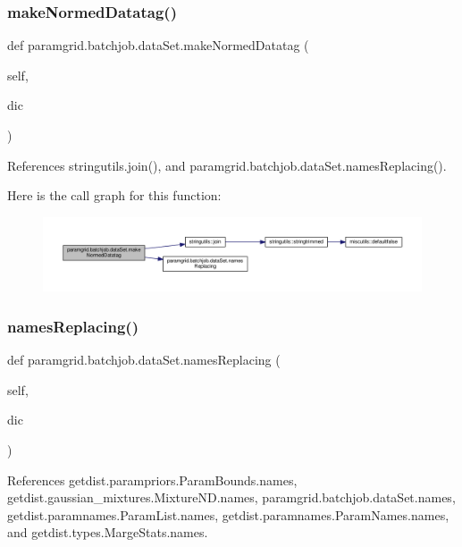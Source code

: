 \subsubsection{\texorpdfstring{make\+Normed\+Datatag()}{makeNormedDatatag()}}
{\footnotesize\ttfamily def paramgrid.\+batchjob.\+data\+Set.\+make\+Normed\+Datatag (\begin{DoxyParamCaption}\item[{}]{self,  }\item[{}]{dic }\end{DoxyParamCaption})}



References stringutils.\+join(), and paramgrid.\+batchjob.\+data\+Set.\+names\+Replacing().

Here is the call graph for this function\+:
\nopagebreak
\begin{figure}[H]
\begin{center}
\leavevmode
\includegraphics[width=350pt]{classparamgrid_1_1batchjob_1_1dataSet_addd5471366fd629a38a1ec8f90d202a7_cgraph}
\end{center}
\end{figure}
\mbox{\label{classparamgrid_1_1batchjob_1_1dataSet_a1f3cc42154d9d4a05b363c1d98e329aa}} 
\subsubsection{\texorpdfstring{names\+Replacing()}{namesReplacing()}}
{\footnotesize\ttfamily def paramgrid.\+batchjob.\+data\+Set.\+names\+Replacing (\begin{DoxyParamCaption}\item[{}]{self,  }\item[{}]{dic }\end{DoxyParamCaption})}



References getdist.\+parampriors.\+Param\+Bounds.\+names, getdist.\+gaussian\+\_\+mixtures.\+Mixture\+N\+D.\+names, paramgrid.\+batchjob.\+data\+Set.\+names, getdist.\+paramnames.\+Param\+List.\+names, getdist.\+paramnames.\+Param\+Names.\+names, and getdist.\+types.\+Marge\+Stats.\+names.



